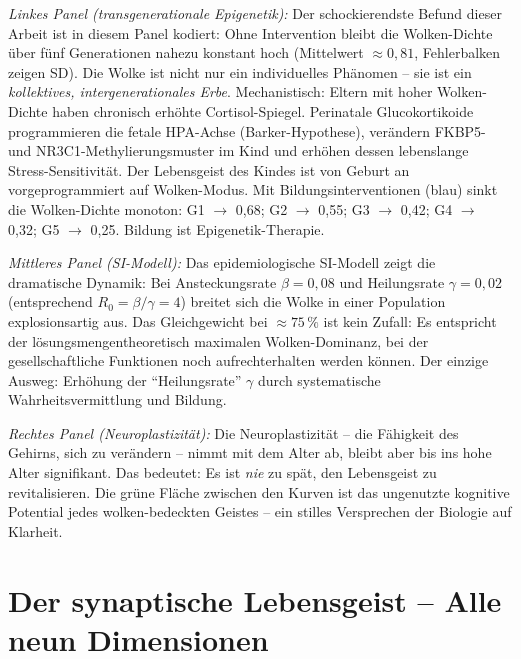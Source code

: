 ﻿\documentclass[12pt,a4paper]{report}
\theoremstyle{plain}
\theoremstyle{definition}
\theoremstyle{remark}
\begin{document}
	\textit{Linkes Panel (transgenerationale Epigenetik):}
	Der schockierendste Befund dieser Arbeit ist in diesem Panel kodiert:
	Ohne Intervention bleibt die Wolken-Dichte über fünf Generationen nahezu
	konstant hoch (Mittelwert $\approx 0{,}81$, Fehlerbalken zeigen SD).
	Die Wolke ist nicht nur ein individuelles Phänomen -- sie ist ein
	\emph{kollektives, intergenerationales Erbe}.
	Mechanistisch: Eltern mit hoher Wolken-Dichte haben chronisch erhöhte
	Cortisol-Spiegel. Perinatale Glucokortikoide programmieren die fetale
	HPA-Achse (Barker-Hypothese), verändern FKBP5- und NR3C1-Methylierungsmuster
	im Kind und erhöhen dessen lebenslange Stress-Sensitivität.
	Der Lebensgeist des Kindes ist von Geburt an vorgeprogrammiert auf
	Wolken-Modus.
	Mit Bildungsinterventionen (blau) sinkt die Wolken-Dichte monoton:
	G1 $\to$ 0{,}68; G2 $\to$ 0{,}55; G3 $\to$ 0{,}42; G4 $\to$ 0{,}32; G5 $\to$ 0{,}25.
	Bildung ist Epigenetik-Therapie.

	\textit{Mittleres Panel (SI-Modell):}
	Das epidemiologische SI-Modell zeigt die dramatische Dynamik:
	Bei Ansteckungsrate $\beta = 0{,}08$ und Heilungsrate $\gamma = 0{,}02$
	(entsprechend $R_0 = \beta/\gamma = 4$) breitet sich die Wolke in einer
	Population explosionsartig aus. Das Gleichgewicht bei $\approx 75\,\%$
	ist kein Zufall: Es entspricht der lösungsmengentheoretisch maximalen
	Wolken-Dominanz, bei der gesellschaftliche Funktionen noch aufrechterhalten
	werden können.
	Der einzige Ausweg: Erhöhung der ``Heilungsrate'' $\gamma$ durch
	systematische Wahrheitsvermittlung und Bildung.

	\textit{Rechtes Panel (Neuroplastizität):}
	Die Neuroplastizität -- die Fähigkeit des Gehirns, sich zu verändern
	-- nimmt mit dem Alter ab, bleibt aber bis ins hohe Alter signifikant.
	Das bedeutet: Es ist \emph{nie} zu spät, den Lebensgeist zu revitalisieren.
	Die grüne Fläche zwischen den Kurven ist das ungenutzte kognitive
	Potential jedes wolken-bedeckten Geistes -- ein stilles Versprechen
	der Biologie auf Klarheit.
	
	\section{Der synaptische Lebensgeist -- Alle neun Dimensionen}
	
\end{document}
